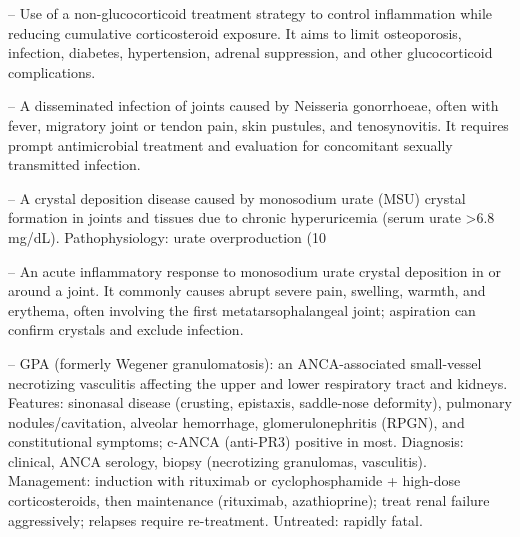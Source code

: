 -- Use of a non-glucocorticoid treatment strategy to control inflammation while reducing cumulative corticosteroid exposure. It aims to limit osteoporosis, infection, diabetes, hypertension, adrenal suppression, and other glucocorticoid complications.

-- A disseminated infection of joints caused by Neisseria gonorrhoeae, often with fever, migratory joint or tendon pain, skin pustules, and tenosynovitis. It requires prompt antimicrobial treatment and evaluation for concomitant sexually transmitted infection.

-- A crystal deposition disease caused by monosodium urate (MSU) crystal formation in joints and tissues due to chronic hyperuricemia (serum urate >6.8 mg/dL). Pathophysiology: urate overproduction (10%

-- An acute inflammatory response to monosodium urate crystal deposition in or around a joint. It commonly causes abrupt severe pain, swelling, warmth, and erythema, often involving the first metatarsophalangeal joint; aspiration can confirm crystals and exclude infection.

-- GPA (formerly Wegener granulomatosis): an ANCA-associated small-vessel necrotizing vasculitis affecting the upper and lower respiratory tract and kidneys. Features: sinonasal disease (crusting, epistaxis, saddle-nose deformity), pulmonary nodules/cavitation, alveolar hemorrhage, glomerulonephritis (RPGN), and constitutional symptoms; c-ANCA (anti-PR3) positive in most. Diagnosis: clinical, ANCA serology, biopsy (necrotizing granulomas, vasculitis). Management: induction with rituximab or cyclophosphamide + high-dose corticosteroids, then maintenance (rituximab, azathioprine); treat renal failure aggressively; relapses require re-treatment. Untreated: rapidly fatal.

